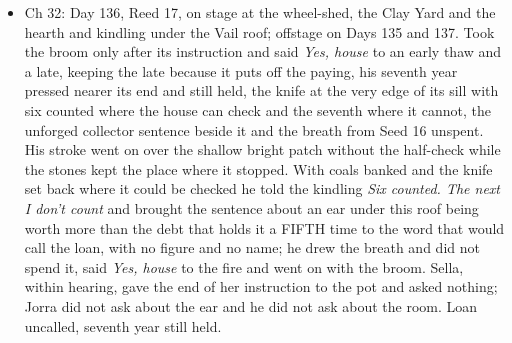 \documentclass{design/chronicle}
\begin{document}
{\begin{itemize}[leftmargin=1.4em,itemsep=1pt,topsep=3pt,parsep=0pt]
\item Ch 32: Day 136, Reed 17, on stage at the wheel-shed, the Clay Yard and the hearth and kindling under the Vail roof; offstage on Days 135 and 137. Took the broom only after its instruction and said \emph{Yes, house} to an early thaw and a late, keeping the late because it puts off the paying, his seventh year pressed nearer its end and still held, the knife at the very edge of its sill with six counted where the house can check and the seventh where it cannot, the unforged collector sentence beside it and the breath from Seed 16 unspent. His stroke went on over the shallow bright patch without the half-check while the stones kept the place where it stopped. With coals banked and the knife set back where it could be checked he told the kindling \emph{Six counted. The next I don’t count} and brought the sentence about an ear under this roof being worth more than the debt that holds it a FIFTH time to the word that would call the loan, with no figure and no name; he drew the breath and did not spend it, said \emph{Yes, house} to the fire and went on with the broom. Sella, within hearing, gave the end of her instruction to the pot and asked nothing; Jorra did not ask about the ear and he did not ask about the room. Loan uncalled, seventh year still held.

\end{itemize}

\begin{itemize}[leftmargin=1.4em,itemsep=1pt,topsep=3pt,parsep=0pt]


\end{itemize}}
\end{document}
